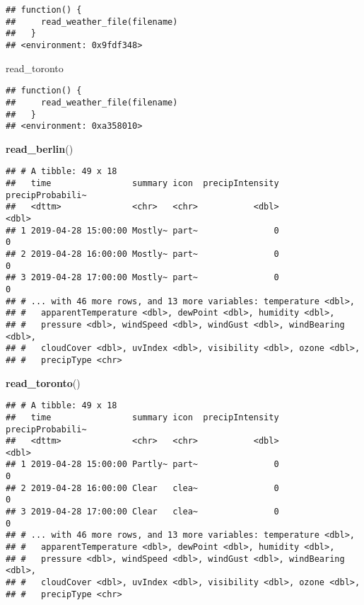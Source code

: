 \documentclass[]{book}
\newenvironment{Shaded}{\begin{snugshade}}{\end{snugshade}}
\newcommand{\KeywordTok}[1]{\textcolor[rgb]{0.13,0.29,0.53}{\textbf{#1}}}
\newcommand{\NormalTok}[1]{#1}
\begin{document}
\begin{verbatim}
## function() {
##     read_weather_file(filename)
##   }
## <environment: 0x9fdf348>
\end{verbatim}

\begin{Shaded}
\begin{Highlighting}[]
\NormalTok{read_toronto}
\end{Highlighting}
\end{Shaded}

\begin{verbatim}
## function() {
##     read_weather_file(filename)
##   }
## <environment: 0xa358010>
\end{verbatim}

\begin{Shaded}
\begin{Highlighting}[]
\KeywordTok{read_berlin}\NormalTok{()}
\end{Highlighting}
\end{Shaded}

\begin{verbatim}
## # A tibble: 49 x 18
##   time                summary icon  precipIntensity precipProbabili~
##   <dttm>              <chr>   <chr>           <dbl>            <dbl>
## 1 2019-04-28 15:00:00 Mostly~ part~               0                0
## 2 2019-04-28 16:00:00 Mostly~ part~               0                0
## 3 2019-04-28 17:00:00 Mostly~ part~               0                0
## # ... with 46 more rows, and 13 more variables: temperature <dbl>,
## #   apparentTemperature <dbl>, dewPoint <dbl>, humidity <dbl>,
## #   pressure <dbl>, windSpeed <dbl>, windGust <dbl>, windBearing <dbl>,
## #   cloudCover <dbl>, uvIndex <dbl>, visibility <dbl>, ozone <dbl>,
## #   precipType <chr>
\end{verbatim}

\begin{Shaded}
\begin{Highlighting}[]
\KeywordTok{read_toronto}\NormalTok{()}
\end{Highlighting}
\end{Shaded}

\begin{verbatim}
## # A tibble: 49 x 18
##   time                summary icon  precipIntensity precipProbabili~
##   <dttm>              <chr>   <chr>           <dbl>            <dbl>
## 1 2019-04-28 15:00:00 Partly~ part~               0                0
## 2 2019-04-28 16:00:00 Clear   clea~               0                0
## 3 2019-04-28 17:00:00 Clear   clea~               0                0
## # ... with 46 more rows, and 13 more variables: temperature <dbl>,
## #   apparentTemperature <dbl>, dewPoint <dbl>, humidity <dbl>,
## #   pressure <dbl>, windSpeed <dbl>, windGust <dbl>, windBearing <dbl>,
## #   cloudCover <dbl>, uvIndex <dbl>, visibility <dbl>, ozone <dbl>,
## #   precipType <chr>
\end{verbatim}
\end{document}

